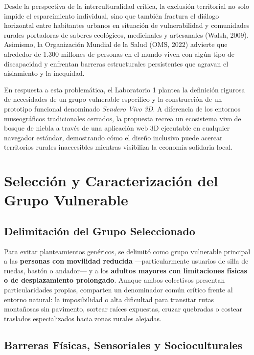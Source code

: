 \documentclass[12pt,letterpaper]{article}
\begin{document}
Desde la perspectiva de la interculturalidad crítica, la exclusión territorial no solo impide el esparcimiento individual, sino que también fractura el diálogo horizontal entre habitantes urbanos en situación de vulnerabilidad y comunidades rurales portadoras de saberes ecológicos, medicinales y artesanales (Walsh, 2009). Asimismo, la Organización Mundial de la Salud (OMS, 2022) advierte que alrededor de 1.300 millones de personas en el mundo viven con algún tipo de discapacidad y enfrentan barreras estructurales persistentes que agravan el aislamiento y la inequidad.

En respuesta a esta problemática, el Laboratorio 1 plantea la definición rigurosa de necesidades de un grupo vulnerable específico y la construcción de un prototipo funcional denominado \textit{Sendero Vivo 3D}. A diferencia de los entornos museográficos tradicionales cerrados, la propuesta recrea un ecosistema vivo de bosque de niebla a través de una aplicación web 3D ejecutable en cualquier navegador estándar, demostrando cómo el diseño inclusivo puede acercar territorios rurales inaccesibles mientras visibiliza la economía solidaria local.

\section{Selección y Caracterización del Grupo Vulnerable}

\subsection{Delimitación del Grupo Seleccionado}

Para evitar planteamientos genéricos, se delimitó como grupo vulnerable principal a las \textbf{personas con movilidad reducida} —particularmente usuarios de silla de ruedas, bastón o andador— y a los \textbf{adultos mayores con limitaciones físicas o de desplazamiento prolongado}. Aunque ambos colectivos presentan particularidades propias, comparten un denominador común crítico frente al entorno natural: la imposibilidad o alta dificultad para transitar rutas montañosas sin pavimento, sortear raíces expuestas, cruzar quebradas o costear traslados especializados hacia zonas rurales alejadas.

\subsection{Barreras Físicas, Sensoriales y Socioculturales}
\end{document}
